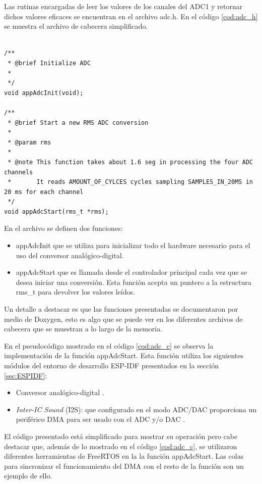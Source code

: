 Las rutinas encargadas de leer los valores de los canales del ADC1 y retornar dichos valores eficaces se encuentran en el archivo adc.h. En el código \ref{cod:adc_h} se muestra el archivo de cabecera simplificado. 

\begin{lstlisting}[label=cod:adc_h,caption=Pseudocódigo del módulo adc.h.] % Start your code-block

/**
 * @brief Initialize ADC 
 * 
 */
void appAdcInit(void);

/**
 * @brief Start a new RMS ADC conversion
 * 
 * @param rms
 *
 * @note This function takes about 1.6 seg in processing the four ADC channels
 *       It reads AMOUNT_OF_CYLCES cycles sampling SAMPLES_IN_20MS in 20 ms for each channel
 */
void appAdcStart(rms_t *rms);

\end{lstlisting}

En el archivo se definen dos funciones:
\begin{itemize}
\item appAdcInit que se utiliza para inicializar todo el hardware necesario para el uso del conversor analógico-digital.
\item appAdcStart que es llamada desde el controlador principal cada vez que se desea iniciar una conversión. Esta función acepta un puntero a la estructura rms\_t para devolver los valores leídos. 
\end{itemize}

Un detalle a destacar es que las funciones presentadas se documentaron por medio de Doxygen, esto es algo que se puede ver en los diferentes archivos de cabecera que se muestran a lo largo de la memoria.

En el pseudocódigo mostrado en el código \ref{cod:adc_c} se observa la implementación de la función appAdcStart. Esta función utiliza los siguientes módulos del entorno de desarrollo ESP-IDF presentados en la sección \ref{sec:ESPIDF}: 
\begin{itemize}
\item Conversor analógico-digital \citep{ADC}.
\item \textit{Inter-IC Sound} (I2S): que configurado en el modo ADC/DAC proporciona un periférico DMA para ser usado con el ADC y/o DAC \citep{I2S}.
\end{itemize}

El código presentado está simplificado para mostrar su operación pero cabe destacar que, además de lo mostrado en el código \ref{cod:adc_c}, se utilizaron diferentes herramientas de FreeRTOS en la la función appAdcStart. Las colas para sincronizar el funcionamiento del DMA con el resto de la función son un ejemplo de ello.

